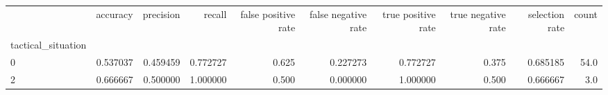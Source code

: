 \begin{tabular}{lrrrrrrrrr}
\toprule
{} &  accuracy &  precision &    recall &  false positive rate &  false negative rate &  true positive rate &  true negative rate &  selection rate &  count \\
tactical\_situation &           &            &           &                      &                      &                     &                     &                 &        \\
\midrule
0                  &  0.537037 &   0.459459 &  0.772727 &                0.625 &             0.227273 &            0.772727 &               0.375 &        0.685185 &   54.0 \\
2                  &  0.666667 &   0.500000 &  1.000000 &                0.500 &             0.000000 &            1.000000 &               0.500 &        0.666667 &    3.0 \\
\bottomrule
\end{tabular}
